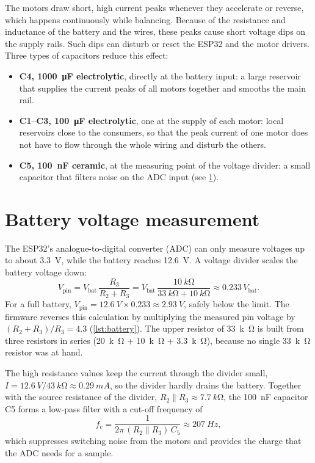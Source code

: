 The motors draw short, high current peaks whenever they accelerate or reverse, which happens
continuously while balancing. Because of the resistance and inductance of the battery and the
wires, these peaks cause short voltage dips on the supply rails. Such dips can disturb or reset
the ESP32 and the motor drivers. Three types of capacitors reduce this effect:
\begin{itemize}
  \item \textbf{C4, \SI{1000}{\micro F} electrolytic}, directly at the battery input: a large
        reservoir that supplies the current peaks of all motors together and smooths the main
        rail.
  \item \textbf{C1--C3, \SI{100}{\micro F} electrolytic}, one at the supply of each motor: local
        reservoirs close to the consumers, so that the peak current of one motor does not have to
        flow through the whole wiring and disturb the others.
  \item \textbf{C5, \SI{100}{nF} ceramic}, at the measuring point of the voltage divider: a small
        capacitor that filters noise on the ADC input (see \cref{sec:divider}).
\end{itemize}

\section{Battery voltage measurement}
\label{sec:divider}

The ESP32's analogue-to-digital converter (ADC) can only measure voltages up to about
\SI{3.3}{V}, while the battery reaches \SI{12.6}{V}. A voltage divider scales the battery voltage
down:
\begin{equation}
  V_\text{pin} = V_\text{bat}\,\frac{R_3}{R_2 + R_3}
             = V_\text{bat}\,\frac{\SI{10}{k\ohm}}{\SI{33}{k\ohm} + \SI{10}{k\ohm}}
             \approx 0.233\,V_\text{bat}.
\end{equation}
For a full battery, $V_\text{pin} = \SI{12.6}{V} \times 0.233 \approx \SI{2.93}{V}$, safely below
the limit. The firmware reverses this calculation by multiplying the measured pin voltage by
$(R_2+R_3)/R_3 = 4.3$ (\cref{lst:battery}). The upper resistor of \SI{33}{k\ohm} is built from
three resistors in series (\SI{20}{k\ohm} + \SI{10}{k\ohm} + \SI{3.3}{k\ohm}), because no single
\SI{33}{k\ohm} resistor was at hand.

The high resistance values keep the current through the divider small,
$I = \SI{12.6}{V} / \SI{43}{k\ohm} \approx \SI{0.29}{mA}$, so the divider hardly drains the battery.
Together with the source resistance of the divider,
$R_2 \parallel R_3 \approx \SI{7.7}{k\ohm}$, the \SI{100}{nF} capacitor C5 forms a low-pass filter
with a cut-off frequency of
\begin{equation}
  f_c = \frac{1}{2\pi\,(R_2\parallel R_3)\,C_5} \approx \SI{207}{Hz},
\end{equation}
which suppresses switching noise from the motors and provides the charge that the ADC needs for a
sample.

